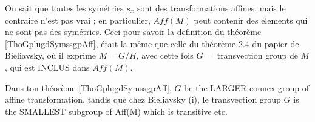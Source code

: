 \begin{enumerate}
On sait que toutes les symétries $s_x$ sont des transformations affines, mais le contraire n’est pas vrai ; en particulier, $Aff(M)$  peut contenir des elements qui ne sont pas des symétries.  Ceci pour savoir la definition du théorème  \ref{ThoGplugdSymssgpAff}, était la même que celle du théorème 2.4 du papier de Bieliavsky, où il exprime $M=G/H$, avec cette fois $G =$ transvection group de $M$, qui est INCLUS dans $Aff(M)$. 

Dans ton théorème \ref{ThoGplugdSymssgpAff}, $G$ be the LARGER connex group of affine transformation, tandis que chez Bieliavsky (i), le transvection group $G$ is the SMALLEST subgroup of Aff(M) which is transitive etc.

\end{enumerate}
